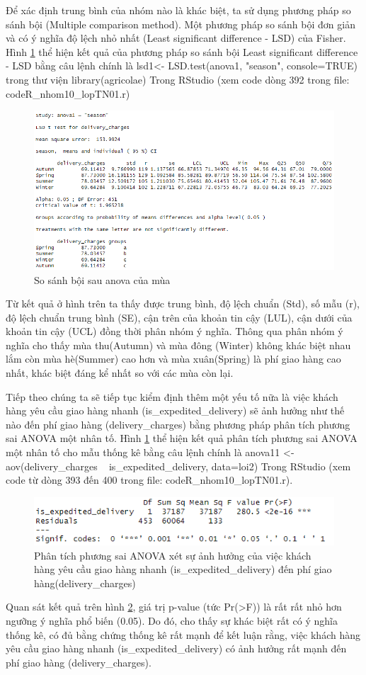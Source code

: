 Để xác định trung bình của nhóm nào là khác biệt, ta sử dụng phương pháp so sánh bội (Multiple comparison method). Một phương pháp so sánh bội đơn giản và có ý nghĩa độ lệch nhỏ nhất (Least significant difference - LSD) của Fisher. Hình \ref{fig:5.2} thể hiện kết quả của phương pháp so sánh bội Least significant difference - LSD bằng câu lệnh chính là lsd1<- LSD.test(anova1, "season", console=TRUE) trong thư viện library(agricolae) Trong RStudio (xem code dòng 392 trong file: codeR\_nhom10\_lopTN01.r)
\begin{figure}[!htbp]
    \centering
    \includegraphics[width=0.6\linewidth]{graphics/5.3.3.png}
    \caption{So sánh bội sau anova của mùa}
    \label{fig:5.2}
\end{figure}
Từ kết quả ở hình trên ta thấy được trung bình, độ lệch chuẩn (Std), số mẫu (r), độ lệch chuẩn trung bình (SE), cận trên của khoản tin cậy (LUL), cận dưới của khoản tin cậy (UCL) đồng thời phân nhóm ý nghĩa. Thông qua phân nhóm ý nghĩa cho thấy mùa thu(Autumn) và mùa đông (Winter) không khác biệt nhau lắm còn mùa hè(Summer) cao hơn và mùa xuân(Spring) là phí giao hàng cao nhất, khác biệt đáng kể nhất so với các mùa còn lại.

Tiếp theo chúng ta sẽ tiếp tục kiểm định thêm một yếu tố nữa là việc khách hàng yêu cầu giao hàng nhanh (is\_expedited\_delivery) sẽ ảnh hưởng như thế nào đến phí giao hàng (delivery\_charges) bằng phương pháp phân tích phương sai ANOVA một nhân tố. Hình \ref{fig:5.2} thể hiện kết quả phân tích phương sai ANOVA một nhân tố cho mẫu thống kê bằng câu lệnh chính là anova11 <- aov(delivery\_charges ~ is\_expedited\_delivery, data=loi2) Trong RStudio (xem code từ dòng 393 đến 400 trong file: codeR\_nhom10\_lopTN01.r).
\begin{figure}[!htbp]
    \centering
    \includegraphics[width=0.7\linewidth]{graphics/5.3.2.png}
    \caption{Phân tích phương sai ANOVA xét sự ảnh hưởng của việc khách hàng yêu cầu giao hàng nhanh (is\_expedited\_delivery) đến phí giao hàng(delivery\_charges)}
    \label{fig:5.3}
\end{figure}
Quan sát kết quả trên hình \ref{fig:5.3}, giá trị p-value (tức Pr(>F)) là rất rất nhỏ hơn ngưỡng ý nghĩa phổ biến (0.05). Do đó, cho thấy sự khác biệt rất có ý nghĩa thống kê, có đủ bằng chứng thống kê rất mạnh để kết luận rằng, việc khách hàng yêu cầu giao hàng nhanh (is\_expedited\_delivery) có ảnh hưởng rất mạnh đến phí giao hàng (delivery\_charges).


